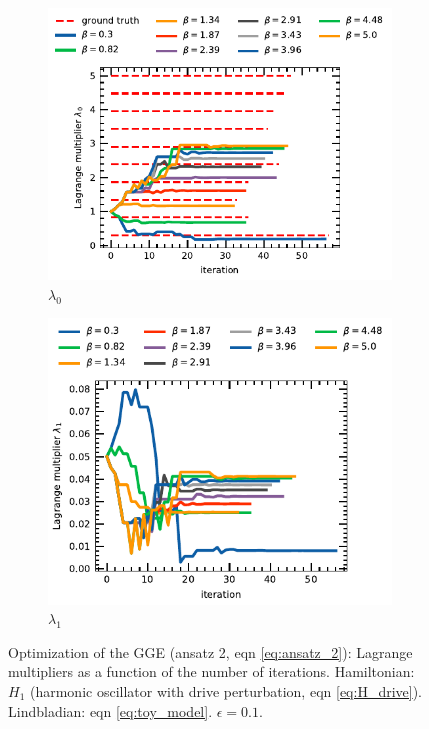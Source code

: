 \begin{figure}[t]
     \centering
     \begin{subfigure}[c]{0.45\textwidth}
         \centering
         \includegraphics[scale=0.9]{figs/opti_case_3_lagr_0.pdf}
         \caption{$\lambda_0$}
         \label{fig:opti_case_3_0}
     \end{subfigure}
     \hfill
     \begin{subfigure}[c]{0.45\textwidth}
         \centering
         \includegraphics[scale=0.9]{figs/opti_case_3_lagr_1.pdf}
         \caption{$\lambda_1$}
         \label{fig:opti_case_3_1}
     \end{subfigure}
        \caption{Optimization of the GGE (ansatz 2, eqn \ref{eq:ansatz_2}): Lagrange multipliers as a function of the number of iterations. Hamiltonian: $H_1$ (harmonic oscillator with drive perturbation, eqn \ref{eq:H_drive}). Lindbladian: eqn \ref{eq:toy_model}. $\epsilon = 0.1$.}
        \label{fig:opti_case_3_all}
\end{figure}

